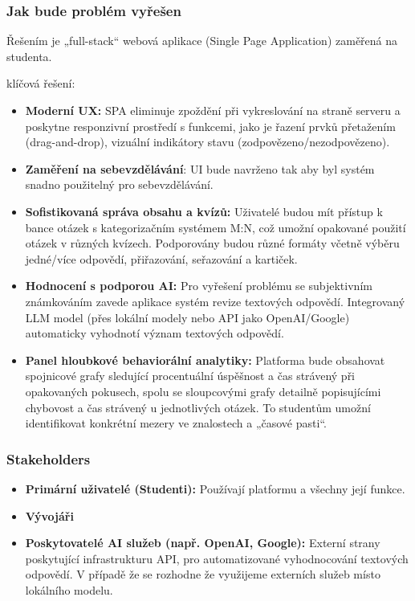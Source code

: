 \documentclass{vskpou} %
\begin{document}
\subsubsection*{Jak bude problém vyřešen}

Řešením je „full-stack“ webová aplikace (Single Page Application) zaměřená na studenta.

klíčová řešení:

\begin{itemize}
    \item \textbf{Moderní UX:} SPA eliminuje zpoždění při vykreslování na straně serveru a poskytne responzivní prostředí s funkcemi, jako je řazení prvků přetažením (drag-and-drop), vizuální indikátory stavu (zodpovězeno/nezodpovězeno).
    \item \textbf{Zaměření na sebevzdělávání}: UI bude navrženo tak aby byl systém snadno použitelný pro sebevzdělávání.
    \item \textbf{Sofistikovaná správa obsahu a kvízů:} Uživatelé budou mít přístup k bance otázek s kategorizačním systémem M:N, což umožní opakované použití otázek v různých kvízech. Podporovány budou různé formáty včetně výběru jedné/více odpovědí, přiřazování, seřazování a kartiček.
    \item \textbf{Hodnocení s podporou AI:} Pro vyřešení problému se subjektivním známkováním zavede aplikace systém revize textových odpovědí. Integrovaný LLM model (přes lokální modely nebo API jako OpenAI/Google) automaticky vyhodnotí význam textových odpovědí.
    \item \textbf{Panel hloubkové behaviorální analytiky:} Platforma bude obsahovat spojnicové grafy sledující procentuální úspěšnost a čas strávený při opakovaných pokusech, spolu se sloupcovými grafy detailně popisujícími chybovost a čas strávený u jednotlivých otázek. To studentům umožní identifikovat konkrétní mezery ve znalostech a „časové pasti“.
\end{itemize}

\subsubsection*{Stakeholders}

\begin{itemize}
    \item \textbf{Primární uživatelé (Studenti):} Používají platformu a všechny její funkce.
    \item \textbf{Vývojáři}
    \item \textbf{Poskytovatelé AI služeb (např. OpenAI, Google):} Externí strany poskytující infrastrukturu API, pro automatizované vyhodnocování textových odpovědí. V případě že se rozhodne že využijeme externích služeb místo lokálního modelu.
\end{itemize}
\end{document}
